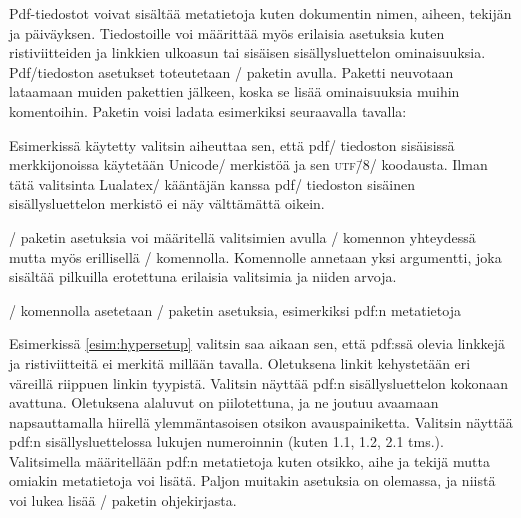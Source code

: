 Pdf-tiedostot voivat sisältää metatietoja kuten dokumentin nimen,
aiheen, tekijän ja päiväyksen. Tiedostoille voi määrittää myös erilaisia
asetuksia kuten ristiviitteiden ja linkkien ulkoasun tai sisäisen
sisällysluettelon ominaisuuksia. Pdf\-/tiedoston asetukset toteutetaan
\-/ paketin avulla. Paketti
neuvotaan lataamaan muiden pakettien jälkeen, koska se lisää
ominaisuuksia muihin komentoihin. Paketin voisi ladata esimerkiksi
seuraavalla tavalla:

\begin{koodilohkosis}
\usepackage[unicode]{hyperref}
\end{koodilohkosis}

Esimerkissä käytetty valitsin  aiheuttaa sen, että pdf\-/
tiedoston sisäisissä merkkijonoissa käytetään Unicode\-/ merkistöä ja
sen \textsc{utf\=/8}\-/ koodausta. Ilman tätä valitsinta Lualatex\-/
kääntäjän kanssa pdf\-/ tiedoston sisäinen sisällysluettelon merkistö ei
näy välttämättä oikein.

\-/ paketin asetuksia voi määritellä valitsimien
avulla \-/ komennon yhteydessä mutta myös
erillisellä \-/ komennolla. Komennolle annetaan
yksi argumentti, joka sisältää pilkuilla erotettuna erilaisia valitsimia
ja niiden arvoja.

\begin{esimerkki*}
\begin{koodilohko}
\end{koodilohko}
  \caption{\-/ komennolla asetetaan
    \-/ paketin asetuksia, esimerkiksi pdf:n
    metatietoja}
  \label{esim:hypersetup}
\end{esimerkki*}

Esimerkissä \ref{esim:hypersetup} valitsin  saa aikaan
sen, että pdf:ssä olevia linkkejä ja ristiviitteitä ei merkitä millään
tavalla. Oletuksena linkit kehystetään eri väreillä riippuen linkin
tyypistä. Valitsin  näyttää pdf:n sisällysluettelon
kokonaan avattuna. Oletuksena alaluvut on piilotettuna, ja ne joutuu
avaamaan napsauttamalla hiirellä ylemmäntasoisen otsikon
avauspainiketta. Valitsin  näyttää pdf:n
sisällysluettelossa lukujen numeroinnin (kuten 1.1, 1.2, 2.1 tms.).
Valitsimella  määritellään pdf:n metatietoja kuten
otsikko, aihe ja tekijä mutta omiakin metatietoja voi lisätä. Paljon
muitakin asetuksia on olemassa, ja niistä voi lukea lisää
\-/ paketin ohjekirjasta.

